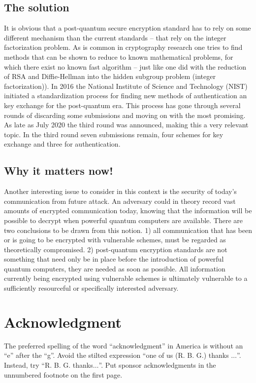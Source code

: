 \documentclass[conference]{IEEEtran}
\begin{document}
\subsection{The solution}
It is obvious that a post-quantum secure encryption standard has to rely on some different mechanism than the current standards -- that rely on the integer factorization problem.
As is common in cryptography research one tries to find methods that can be shown to reduce to known mathematical problems, for which there exist no known fast algorithm -- just like one did with the reduction of RSA and Diffie-Hellman into the hidden subgroup problem (integer factorization)).
In 2016 the National Institute of Science and Technology (NIST) initiated a standardization process for finding new methods of authentication an key exchange for the post-quantum era.
This process has gone through several rounds of discarding some submissions and moving on with the most promising.
As late as July 2020 the third round was announced, making this a very relevant topic.
In the third round seven submissions remain, four schemes for key exchange and three for authentication.

\subsection{Why it matters now!}
Another interesting issue to consider in this context is the security of today's communication from future attack.
An adversary could in theory record vast amounts of encrypted communication today, knowing that the information will be possible to decrypt when powerful quantum computers are available.
There are two conclusions to be drawn from this notion.
1) all communication that has been or is going to be encrypted with vulnerable schemes, must be regarded as theoretically compromised.
2) post-quantum encryption standards are not something that need only be in place before the introduction of powerful quantum computers, they are needed as soon as possible.
All information currently being encrypted using vulnerable schemes is ultimately vulnerable to a sufficiently resourceful or specifically interested adversary.


\section*{Acknowledgment}

The preferred spelling of the word ``acknowledgment'' in America is without 
an ``e'' after the ``g''. Avoid the stilted expression ``one of us (R. B. 
G.) thanks $\ldots$''. Instead, try ``R. B. G. thanks$\ldots$''. Put sponsor 
acknowledgments in the unnumbered footnote on the first page.
\end{document}
